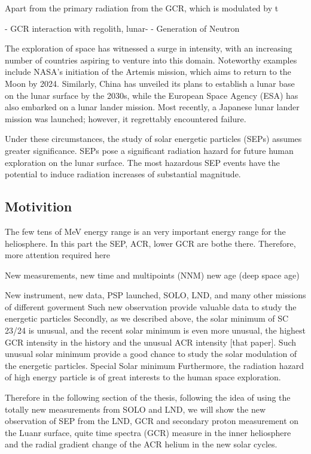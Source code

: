 Apart from the primary radiation from the GCR, which is modulated by t

- GCR interaction with regolith, lunar-
	- Generation of Neutron

The exploration of space has witnessed a surge in intensity, with an increasing number of countries aspiring to venture into this domain. Noteworthy examples include NASA's initiation of the Artemis mission, which aims to return to the Moon by 2024. Similarly, China has unveiled its plans to establish a lunar base on the lunar surface by the 2030s, while the European Space Agency (ESA) has also embarked on a lunar lander mission. Most recently, a Japanese lunar lander mission was launched; however, it regrettably encountered failure.

Under these circumstances, the study of solar energetic particles (SEPs) assumes greater significance. SEPs pose a significant radiation hazard for future human exploration on the lunar surface. The most hazardous SEP events have the potential to induce radiation increases of substantial magnitude.

\subsection{Motivition}

The few tens of MeV energy range is an very important energy range for the heliosphere. In this part the SEP, ACR, lower GCR are bothe there. Therefore, more attention required here

New measurements, new time and multipoints (NNM)
new age (deep space age)

New instrument, new data, PSP launched, SOLO, LND, and many other missions of different goverment
Such new observation provide valuable data to study the energetic particles
Secondly, as we described above, the solar minimum of SC 23/24 is unusual, and the recent solar minimum is even more unusual, the highest GCR intensity in the history and the unusual ACR intensity [that paper]. Such unusual solar minimum provide a good chance to study the solar modulation of the energetic particles. Special Solar minimum
Furthermore, the radiation hazard of high energy particle is of great interests to the human space exploration. 


Therefore in the following section of the thesis, following the idea of using the totally new measurements from SOLO and LND, we will show the new observation of SEP from the LND, GCR and secondary proton measurement on the Luanr surface, quite time spectra (GCR) measure in the inner heliosphere and the radial gradient change of the ACR helium in the new solar cycles.